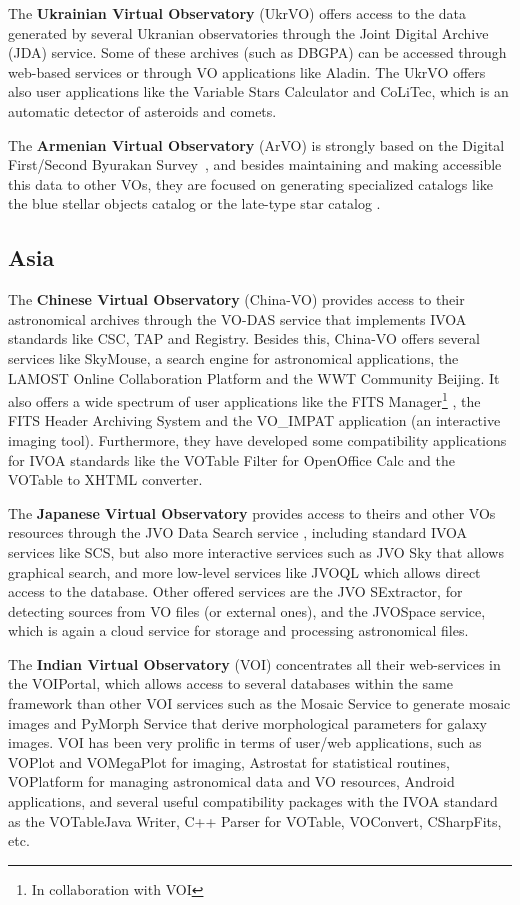 The \textbf{Ukrainian Virtual Observatory} (UkrVO)
offers access to the data generated by several Ukranian observatories 
through the Joint Digital Archive (JDA) service. Some of these archives 
(such as DBGPA)
can be accessed through web-based services or through VO applications like
Aladin. The UkrVO offers also user applications like the Variable Stars
Calculator and CoLiTec, which is an automatic detector of asteroids and
comets.

The \textbf{Armenian Virtual Observatory} (ArVO) is strongly based on the
Digital First/Second Byurakan Survey~\cite{Massaro2008}, 
and besides maintaining and making accessible this data to other VOs,
they are focused on generating specialized catalogs like the
blue stellar objects catalog or the late-type star catalog 
\cite{Mickaelian2008}.

\subsection{Asia}

The \textbf{Chinese Virtual Observatory} (China-VO) provides
access to their astronomical archives through the VO-DAS service
that implements IVOA standards like CSC, TAP and Registry. 
Besides this, China-VO offers several services like SkyMouse,
a search engine for astronomical applications, the LAMOST Online
Collaboration Platform and the WWT Community Beijing. It also
offers a wide spectrum of user applications like the FITS Manager\footnote{In
collaboration with VOI} \cite{Cui2012}, 
the FITS Header Archiving System and the VO\_IMPAT
application (an interactive imaging tool). Furthermore, they have developed
some compatibility applications for IVOA standards like the
VOTable Filter for OpenOffice Calc and the 
VOTable to XHTML converter. 

The \textbf{Japanese Virtual Observatory} provides access to theirs
and other VOs resources through the JVO Data Search service 
\cite{Shirasaki2009}, 
including standard IVOA services like SCS, but also more interactive services
such as JVO Sky that allows graphical search, and more low-level
services like JVOQL which allows direct access to the database.
Other offered services are the JVO SExtractor, for detecting sources
from VO files (or external ones), and the JVOSpace service, which is
again a cloud service for storage and processing astronomical files.

The \textbf{Indian Virtual Observatory} (VOI)
concentrates all their web-services in the VOIPortal, which allows
access to several databases within the same framework than other
VOI services such as the Mosaic Service to generate mosaic images 
and PyMorph Service that derive morphological parameters for galaxy
images. VOI has been very prolific in terms of user/web applications, 
such as VOPlot and 
VOMegaPlot for imaging, Astrostat for statistical routines, VOPlatform for
managing astronomical data and VO resources, Android applications, and 
several useful compatibility packages with the IVOA standard as 
the VOTableJava Writer, C++ Parser for VOTable, VOConvert, CSharpFits, etc.

